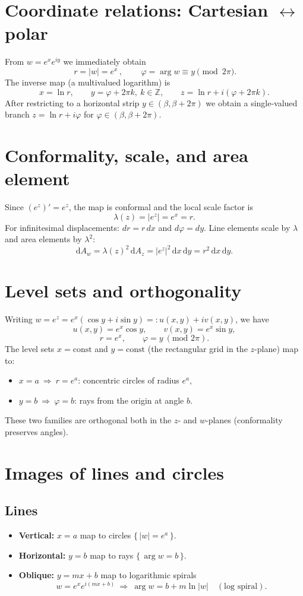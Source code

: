 \documentclass[11pt]{article}
\begin{document}
\section*{Coordinate relations: Cartesian $\leftrightarrow$ polar}
From $w=e^{x}e^{iy}$ we immediately obtain
\[
\boxed{\,r=|w|=e^{x}\,},\qquad
\boxed{\,\varphi=\arg w\equiv y\pmod{2\pi}}.
\]
The inverse map (a multivalued logarithm) is
\[
x=\ln r,\qquad y=\varphi+2\pi k,\ k\in\mathbb{Z},\qquad
z=\ln r + i(\varphi+2\pi k).
\]
After restricting to a horizontal strip $y\in(\beta,\beta+2\pi)$ we obtain a single-valued branch $z=\ln r + i\varphi$ for $\varphi\in(\beta,\beta+2\pi)$.

\section*{Conformality, scale, and area element}
Since $(e^{z})'=e^{z}$, the map is conformal and the local scale factor is
\[
\lambda(z)=|e^{z}|=e^{x}=r.
\]
For infinitesimal displacements: $dr=r\,dx$ and $d\varphi=dy$.
Line elements scale by $\lambda$ and area elements by $\lambda^{2}$:
\[
\mathrm{d}A_{w}=\lambda(z)^{2}\,\mathrm{d}A_{z}=|e^{z}|^{2}\,\mathrm{d}x\,\mathrm{d}y
= r^{2}\,\mathrm{d}x\,\mathrm{d}y.
\]

\section*{Level sets and orthogonality}
Writing $w=e^{z}=e^{x}(\cos y+i\sin y)=:u(x,y)+iv(x,y)$, we have
\[
u(x,y)=e^{x}\cos y,\qquad v(x,y)=e^{x}\sin y,
\]
\[
r=e^{x},\qquad \varphi=y\ (\text{mod }2\pi).
\]
The level sets $x=\text{const}$ and $y=\text{const}$ (the rectangular grid in the $z$-plane) map to:
\begin{itemize}
	\item $x=a\ \Rightarrow\ r=e^{a}$: concentric circles of radius $e^{a}$,
	\item $y=b\ \Rightarrow\ \varphi=b$: rays from the origin at angle $b$.
\end{itemize}
These two families are orthogonal both in the $z$- and $w$-planes (conformality preserves angles).

\section*{Images of lines and circles}
\subsection*{Lines}
\begin{itemize}
	\item \textbf{Vertical:} $x=a$ map to circles $\{\,|w|=e^{a}\,\}$.
	\item \textbf{Horizontal:} $y=b$ map to rays $\{\,\arg w=b\,\}$.
	\item \textbf{Oblique:} $y=mx+b$ map to logarithmic spirals
	\[
	w=e^{x}e^{i(mx+b)}\ \Rightarrow\ \arg w=b+m\ln|w|\quad(\text{log spiral}).
	\]
\end{itemize}
\end{document}
